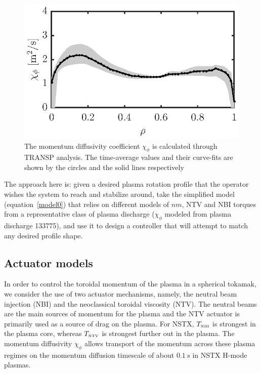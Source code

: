 \documentclass[12pt]{iopart}
\begin{document}
\begin{figure}
\centering
\includegraphics{imene_figs/fig2} %
\caption{The momentum diffusivity coefficient $ \chi_{\phi}$ is calculated through TRANSP analysis. The time-average values and their curve-fits are shown by the circles  and the solid lines respectively}
\label{fig:chiphi}
\end{figure}


The approach here is: given a desired plasma rotation profile that the operator wishes the system to reach and stabilize around, take the simplified model (equation~\ref{model0}) that relies on different models of $ n  m$, NTV and NBI torques from a representative class of plasma discharge ($\chi_\phi$ modeled from plasma discharge 133775), and use it to design a controller that will attempt to match any desired profile shape.

\subsection{Actuator models}

In order to control the toroidal momentum of the plasma in a spherical tokamak, we consider the use of two actuator mechanisms, namely, the neutral beam injection (NBI) and the neoclassical toroidal viscosity (NTV). The neutral beams are the main sources of momentum for the plasma and the NTV actuator is primarily used as a source of drag on the plasma. For NSTX, $T_\textrm{\tiny NBI}$ is strongest  in the plasma core, whereas $T_\textrm{\tiny NTV}$ is strongest further out in the plasma. The momentum diffusivity $\chi_\phi$ allows transport of the momentum across these plasma regimes on the momentum diffusion timescale of about $0.1\,s$ in NSTX H-mode plasmas.
\end{document}
